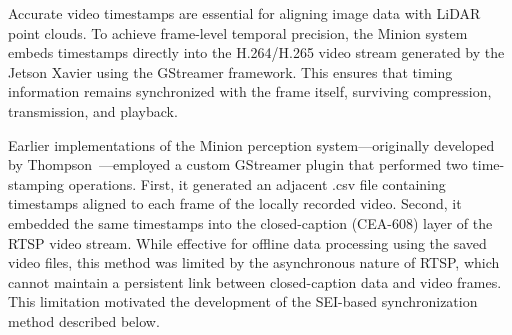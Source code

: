 \documentclass[../main.tex]{subfiles}
\begin{document}

Accurate video timestamps are essential for aligning image data with LiDAR point clouds. To achieve frame-level temporal precision, the Minion system embeds timestamps directly into the H.264/H.265 video stream generated by the Jetson Xavier using the GStreamer framework. This ensures that timing information remains synchronized with the frame itself, surviving compression, transmission, and playback.

Earlier implementations of the Minion perception system—originally developed by Thompson~\cite{thompson2023}—employed a custom GStreamer plugin that performed two time-stamping operations. 
First, it generated an adjacent .csv file containing timestamps aligned to each frame of the locally recorded video. 
Second, it embedded the same timestamps into the closed-caption (CEA-608) layer of the \ac{RTSP} video stream. 
While effective for offline data processing using the saved video files, this method was limited by the asynchronous nature of \ac{RTSP}, which cannot maintain a persistent link between closed-caption data and video frames. 
This limitation motivated the development of the \ac{SEI}-based synchronization method described below.

\end{document}
